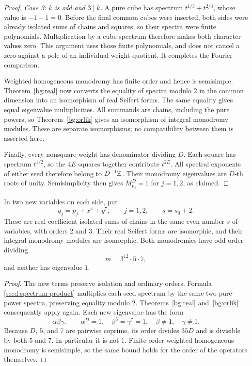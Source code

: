 \begin{proof}
\smallskip\noindent
\emph{Case 3: $k$ is odd and $3\mid k$.}
A pure cube has spectrum $t^{1/3}+t^{2/3}$, whose value is $-1+1=0$.
Before the final common cubes were inserted, both sides were already
isolated sums of chains and squares, so their spectra were finite
polynomials.  Multiplication by a cube spectrum therefore makes both
character values zero.  This argument uses those finite polynomials,
and does not cancel a zero against a pole of an individual weight
quotient.  It completes the Fourier comparison.

Weighted homogeneous monodromy has finite order and hence is
semisimple.  Theorem~\ref{bg:real} now converts the equality of
spectra modulo $2$ in the common dimension into an isomorphism of
real Seifert forms.  The same equality gives equal eigenvalue
multiplicities.  All summands are chains, including the pure powers,
so Theorem~\ref{bg:orlik} gives an isomorphism of integral monodromy
modules.  These are separate isomorphisms; no compatibility between
them is asserted here.

Finally, every nonsquare weight has denominator dividing $D$.
Each square has spectrum $t^{1/2}$, so the $4E$ squares together
contribute $t^{2E}$.  All spectral exponents of either seed therefore
belong to $D^{-1}\mathbb Z$.  Their monodromy eigenvalues are $D$-th roots of
unity.  Semisimplicity then gives $M_{p_j}^D=1$ for $j=1,2$, as claimed.
\end{proof}

\begin{corollary}\label{seed:prepared}
In two new variables on each side, put
\begin{equation}\label{seed:q-definition}
 q_j=p_j+x^5+y^7,\qquad j=1,2,
 \qquad s=s_0+2.
\end{equation}
These are real-coefficient isolated sums of chains in the same even
number $s$ of variables, with orders $2$ and $3$.  Their real Seifert
forms are isomorphic, and their integral monodromy modules are
isomorphic.  Both monodromies have odd order dividing
\[
 m=3^{12}\cdot5\cdot7,
\]
and neither has eigenvalue $1$.
\end{corollary}

\begin{proof}
The new terms preserve isolation and ordinary orders.  Formula
\eqref{seed:spectrum-product} multiplies each seed spectrum by the
same two pure-power spectra, preserving equality modulo $2$.
Theorems~\ref{bg:real} and~\ref{bg:orlik} consequently apply again.
Each new eigenvalue has the form
\[
 \alpha\beta\gamma,\qquad
 \alpha^D=1,\quad
 \beta^5=\gamma^7=1,\quad \beta\ne1,\quad\gamma\ne1.
\]
Because $D$, $5$, and $7$ are pairwise coprime, its order divides
$35D$ and is divisible by both $5$ and $7$.  In particular it is not
$1$.  Finite-order weighted homogeneous monodromy is semisimple, so
the same bound holds for the order of the operators themselves.
\end{proof}
